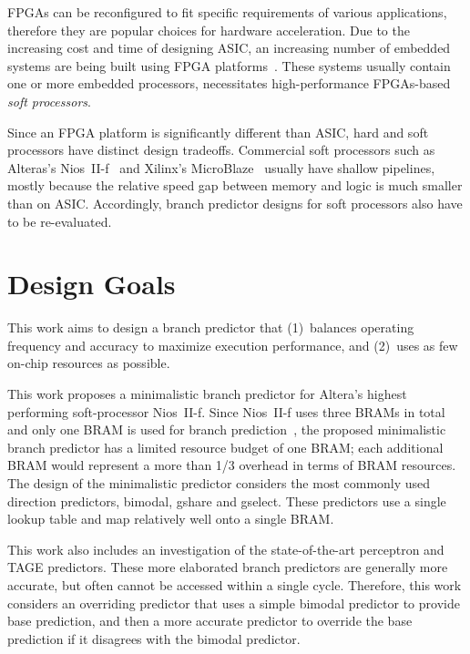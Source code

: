 FPGAs can be reconfigured to fit specific requirements of various applications, therefore they are popular choices for hardware acceleration. Due to the increasing cost and time of designing ASIC, an increasing number of embedded systems are being built using FPGA platforms~\cite{softprocessor}. These systems usually contain one or more embedded processors, necessitates high-performance FPGAs-based \textit{soft processors}. 

Since an FPGA platform is significantly different than ASIC, hard and soft processors have distinct design tradeoffs. Commercial soft processors such as Alteras's Nios~II-f~\cite{niosiif} and Xilinx's MicroBlaze~\cite{microblaze} usually have shallow pipelines, mostly because the relative speed gap between memory and logic is much smaller than on ASIC. Accordingly, branch predictor designs for soft processors also have to be re-evaluated.


\section{Design Goals}
\label{sec:background:goal}

This work aims to design a branch predictor that (1)~balances operating frequency and accuracy to maximize execution performance, and (2)~uses as few on-chip resources as possible.

This work proposes a minimalistic branch predictor for Altera's highest performing soft-processor Nios~II-f. Since Nios~II-f uses three BRAMs in total and only one BRAM is used for branch prediction~\cite{niosiif}, the proposed minimalistic branch predictor has a limited resource budget of one BRAM; each additional BRAM would represent a more than 1/3 overhead in terms of BRAM resources. The design of the minimalistic predictor considers the most commonly used direction predictors, bimodal, gshare and gselect. These predictors use a single lookup table and map relatively well onto a single BRAM.

This work also includes an investigation of the state-of-the-art perceptron and TAGE predictors. These more elaborated branch predictors are generally more accurate, but often cannot be accessed within a single cycle. Therefore, this work considers an overriding predictor that uses a simple bimodal predictor to provide base prediction, and then a more accurate predictor to override the base prediction if it disagrees with the bimodal predictor.


